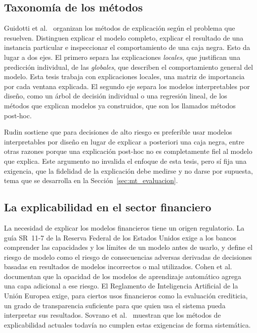 \subsection{Taxonomía de los métodos}

Guidotti et al.\ \cite{guidotti2018} organizan los métodos de explicación según el problema que resuelven. Distinguen explicar el modelo completo, explicar el resultado de una instancia particular e inspeccionar el comportamiento de una caja negra. Esto da lugar a dos ejes. El primero separa las explicaciones \emph{locales}, que justifican una predicción individual, de las \emph{globales}, que describen el comportamiento general del modelo. Esta tesis trabaja con explicaciones locales, una matriz de importancia por cada ventana explicada. El segundo eje separa los modelos interpretables por diseño, como un árbol de decisión individual o una regresión lineal, de los métodos que explican modelos ya construidos, que son los llamados métodos post-hoc.

Rudin \cite{rudin2019} sostiene que para decisiones de alto riesgo es preferible usar modelos interpretables por diseño en lugar de explicar a posteriori una caja negra, entre otras razones porque una explicación post-hoc no es completamente fiel al modelo que explica. Este argumento no invalida el enfoque de esta tesis, pero sí fija una exigencia, que la fidelidad de la explicación debe medirse y no darse por supuesta, tema que se desarrolla en la Sección~\ref{sec:mt_evaluacion}.

\subsection{La explicabilidad en el sector financiero}

La necesidad de explicar los modelos financieros tiene un origen regulatorio. La guía SR~11-7 de la Reserva Federal de los Estados Unidos \cite{sr117} exige a los bancos comprender las capacidades y los límites de un modelo antes de usarlo, y define el riesgo de modelo como el riesgo de consecuencias adversas derivadas de decisiones basadas en resultados de modelos incorrectos o mal utilizados. Cohen et al.\ \cite{cohen2023blackbox} documentan que la opacidad de los modelos de aprendizaje automático agrega una capa adicional a ese riesgo. El Reglamento de Inteligencia Artificial de la Unión Europea \cite{euaiact2024} exige, para ciertos usos financieros como la evaluación crediticia, un grado de transparencia suficiente para que quien usa el sistema pueda interpretar sus resultados. Sovrano et al.\ \cite{sovrano2026} muestran que los métodos de explicabilidad actuales todavía no cumplen estas exigencias de forma sistemática.

